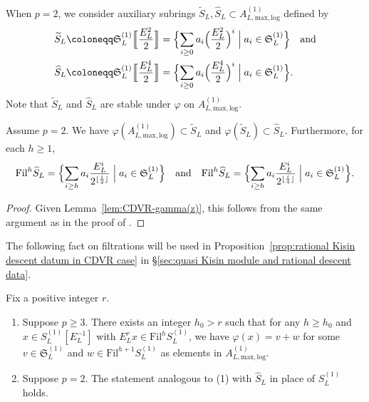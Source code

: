 When $p = 2$, we consider auxiliary subrings $\widetilde{S}_L, \widehat{S}_L \subset A^{(1)}_{L, \mathrm{max, log}}$ defined by
\begin{align*}
\widetilde{S}_L &\coloneqq \mathfrak{S}_L^{(1)}\Bigl[\!\!\Bigl[\frac{E_L^2}{2}\Bigr]\!\!\Bigr] = \Bigl\{\sum_{i \geq 0} a_i\Bigl(\frac{E_L^2}{2}\Bigr)^i \Bigm| a_i \in \mathfrak{S}_L^{(1)} \Bigr\}\quad\text{and}\\    
\widehat{S}_L &\coloneqq \mathfrak{S}_L^{(1)}\Bigl[\!\!\Bigl[\frac{E_L^4}{2}\Bigr]\!\!\Bigr] = \Bigl\{\sum_{i \geq 0} a_i\Bigl(\frac{E_L^4}{2}\Bigr)^i \Bigm| a_i \in \mathfrak{S}_L^{(1)} \Bigr\}.
\end{align*}
Note that $\widetilde{S}_L$ and $\widehat{S}_L$ are stable under $\varphi$ on $A^{(1)}_{L, \mathrm{max, log}}$.

\begin{lem} \label{lem:CDVR-hatS}
Assume $p = 2$. We have $\varphi(A^{(1)}_{L, \mathrm{max, log}}) \subset \widetilde{S}_L$ and $\varphi(\widetilde{S}_L) \subset \widehat{S}_L$. Furthermore, for each $h \geq 1$,
\[
\mathrm{Fil}^h \widetilde{S}_L = \Bigl\{ \sum_{i \geq h} a_i \frac{E_L^i}{2^{\lfloor \frac{i}{2} \rfloor}} \Bigm| a_i \in \mathfrak{S}_L^{(1)} \Bigr\}\quad\text{and}\quad
\mathrm{Fil}^h \widehat{S}_L = \Bigl\{ \sum_{i \geq h} a_i \frac{E_L^i}{2^{\lfloor \frac{i}{4} \rfloor}} \Bigm| a_i \in \mathfrak{S}_L^{(1)} \Bigr\}.
\]
\end{lem}

\begin{proof}
Given Lemma~\ref{lem:CDVR-gamma(z)}, this follows from the same argument as in the proof of \cite[Lem.~2.2.12]{du-liu-prismaticphiGhatmodule}.    
\end{proof}

The following fact on filtrations will be used in Proposition~\ref{prop:rational Kisin descent datum in CDVR case} in \S\ref{sec:quasi Kisin module and rational descent data}. 

\begin{lem} \label{lem:filtration-h0-CDVR}
Fix a positive integer $r$. 
\begin{enumerate}
\item Suppose $p \geq 3$. There exists an integer $h_0 > r$ such that for any $h \geq h_0$ and $x \in S_L^{(1)}[E_L^{-1}]$ with $E_L^r x \in \mathrm{Fil}^h S_L^{(1)}$, we have $\varphi(x) = v+w$ for some $v \in \mathfrak{S}_L^{(1)}$ and $w \in \mathrm{Fil}^{h+1} S_L^{(1)}$ as elements in $A^{(1)}_{L, \mathrm{max}, \mathrm{log}}$.

\item Suppose $p = 2$. The statement analogous to (1) with $\widehat{S}_L$ in place of $S_L^{(1)}$ holds. 
\end{enumerate}
\end{lem}

